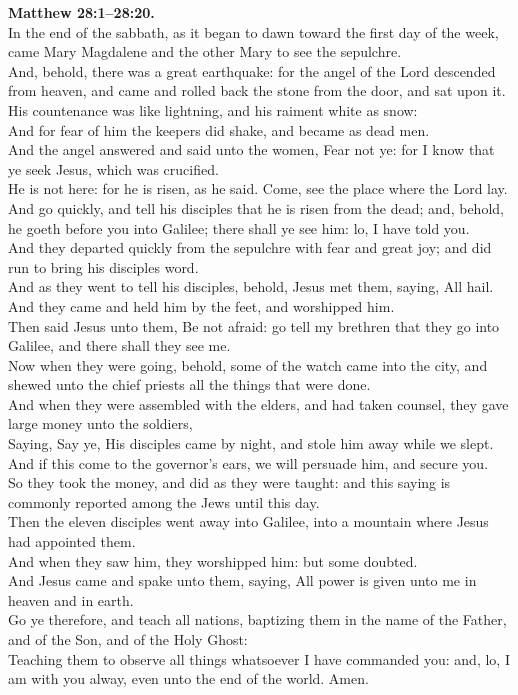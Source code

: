 \documentclass[10pt]{article} %
\begin{document}
{\begin{minipage}[t]{0.45\textwidth}
\textbf{Matthew 28:1--28:20.}\\
In the end of the sabbath, as it began to dawn toward the first day of the week, came Mary Magdalene and the other Mary to see the sepulchre.\\
And, behold, there was a great earthquake: for the angel of the Lord descended from heaven, and came and rolled back the stone from the door, and sat upon it.\\
His countenance was like lightning, and his raiment white as snow:\\
And for fear of him the keepers did shake, and became as dead men.\\
And the angel answered and said unto the women, Fear not ye: for I know that ye seek Jesus, which was crucified.\\
He is not here: for he is risen, as he said. Come, see the place where the Lord lay.\\
And go quickly, and tell his disciples that he is risen from the dead; and, behold, he goeth before you into Galilee; there shall ye see him: lo, I have told you.\\
And they departed quickly from the sepulchre with fear and great joy; and did run to bring his disciples word.\\
And as they went to tell his disciples, behold, Jesus met them, saying, All hail. And they came and held him by the feet, and worshipped him.\\
Then said Jesus unto them, Be not afraid: go tell my brethren that they go into Galilee, and there shall they see me.\\
Now when they were going, behold, some of the watch came into the city, and shewed unto the chief priests all the things that were done.\\
And when they were assembled with the elders, and had taken counsel, they gave large money unto the soldiers,\\
Saying, Say ye, His disciples came by night, and stole him away while we slept.\\
And if this come to the governor's ears, we will persuade him, and secure you.\\
So they took the money, and did as they were taught: and this saying is commonly reported among the Jews until this day.\\
Then the eleven disciples went away into Galilee, into a mountain where Jesus had appointed them.\\
And when they saw him, they worshipped him: but some doubted.\\
And Jesus came and spake unto them, saying, All power is given unto me in heaven and in earth.\\
Go ye therefore, and teach all nations, baptizing them in the name of the Father, and of the Son, and of the Holy Ghost:\\
Teaching them to observe all things whatsoever I have commanded you: and, lo, I am with you alway, even unto the end of the world. Amen.
\end{minipage}}
\end{document}
